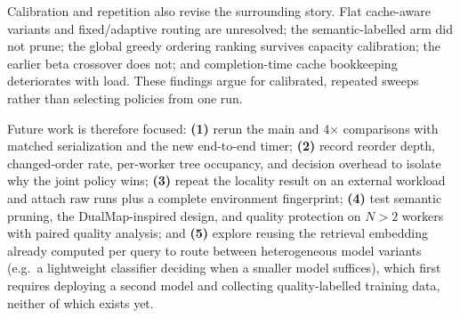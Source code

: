 \documentclass[conference]{IEEEtran}
\begin{document}
Calibration and repetition also revise the surrounding story. Flat
cache-aware variants and fixed/adaptive routing are unresolved; the
semantic-labelled arm did not prune; the global greedy ordering ranking
survives capacity calibration; the earlier beta crossover does not; and
completion-time cache bookkeeping deteriorates with load. These findings
argue for calibrated, repeated sweeps rather than selecting policies from
one run.

Future work is therefore focused: \textbf{(1)} rerun the main and 4$\times$
comparisons with matched serialization and the new end-to-end timer;
\textbf{(2)} record reorder depth, changed-order rate, per-worker tree
occupancy, and decision overhead to isolate why the joint policy wins;
\textbf{(3)} repeat the locality result on an external workload and attach
raw runs plus a complete environment fingerprint; \textbf{(4)} test
semantic pruning, the DualMap-inspired design, and quality protection on
$N>2$ workers with paired quality analysis; and \textbf{(5)} explore
reusing the retrieval embedding already computed per query to route
between heterogeneous model variants (e.g.\ a lightweight classifier
deciding when a smaller model suffices), which first requires deploying
a second model and collecting quality-labelled training data, neither
of which exists yet.
\end{document}
